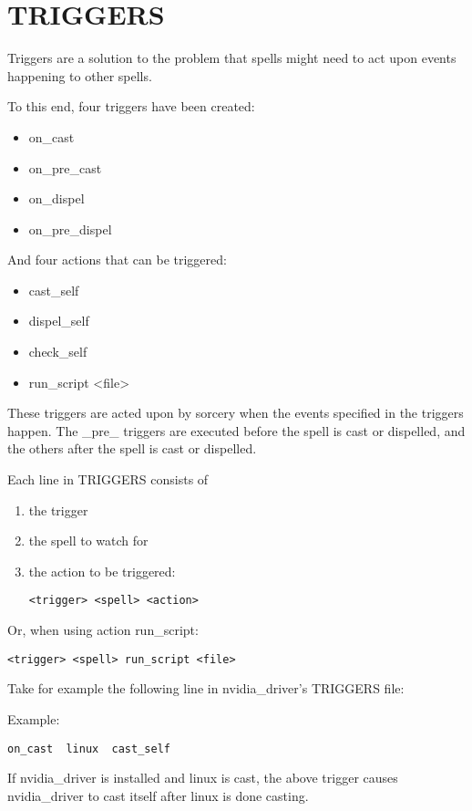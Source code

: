 \documentclass[a4paper,10pt]{book}
\begin{document}
\section{TRIGGERS}
Triggers are a solution to the problem that spells might need to act upon
events happening to other spells.

To this end, four triggers have been created:
\begin{itemize}
\item on\_cast
\item on\_pre\_cast
\item on\_dispel
\item on\_pre\_dispel
\end{itemize}

And four actions that can be triggered:
\begin{itemize}
\item cast\_self
\item dispel\_self
\item check\_self
\item run\_script <file>
\end{itemize}

These triggers are acted upon by sorcery when the events specified in the
triggers happen. The \_pre\_ triggers are executed before the spell is cast or
dispelled, and the others after the spell is cast or dispelled.

Each line in TRIGGERS consists of
\begin{enumerate}
\item the trigger
\item the spell to watch for
\item the action to be triggered:
\begin{verbatim}
<trigger> <spell> <action>
\end{verbatim}
\end{enumerate}

Or, when using action run\_script:
\begin{verbatim}
<trigger> <spell> run_script <file>
\end{verbatim}

Take for example the following line in nvidia\_driver's TRIGGERS file:

Example:
\begin{verbatim}
on_cast  linux  cast_self
\end{verbatim}

If nvidia\_driver is installed and linux is cast, the above trigger causes
nvidia\_driver to cast itself after linux is done casting.
\end{document}

